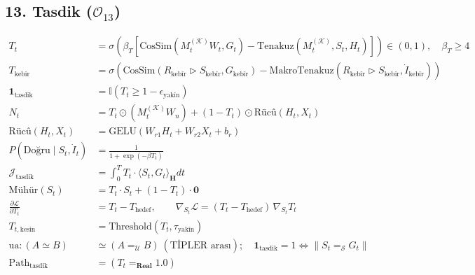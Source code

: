 \documentclass[11pt, a4paper]{article}
\begin{document}
\subsection{13. Tasdik ($\mathcal{O}_{13}$)}
\begin{align}
T_t &= \sigma\left( \beta_T \left[ \text{CosSim}(M_t^{(\mathcal{K})} W_t, G_t) - \text{Tenakuz}(M_t^{(\mathcal{K})}, S_t, H_t) \right] \right) \in (0,1), \quad \beta_T \ge 4 \\
T_{\text{kebîr}} &= \sigma\left( \text{CosSim}(R_{\text{kebîr}} \triangleright S_{\text{kebîr}}, G_{\text{kebîr}}) - \text{MakroTenakuz}(R_{\text{kebîr}} \triangleright S_{\text{kebîr}}, \dot{I}_{\text{kebîr}}) \right) \\
\mathbf{1}_{\text{tasdik}} &= \mathbb{I}(T_t \ge 1 - \epsilon_{\text{yakîn}}) \\
N_t &= T_t \odot (M_t^{(\mathcal{K})} W_n) + (1 - T_t) \odot \text{Rücû}(H_t, X_t) \\
\text{Rücû}(H_t, X_t) &= \text{GELU}(W_{r1} H_t + W_{r2} X_t + b_r) \\
P(\text{Doğru} \mid S_t, \dot{I}_t) &= \frac{1}{1 + \exp(-\beta T_t)} \\
\mathcal{J}_{\text{tasdik}} &= \int_0^T T_t \cdot \langle S_t, G_t \rangle_{\mathbf{H}} dt \\
\text{Mühür}(S_t) &= T_t \cdot S_t + (1 - T_t) \cdot \mathbf{0} \\
\frac{\partial \mathcal{L}}{\partial T_t} &= T_t - T_{\text{hedef}}, \qquad \nabla_{S_t} \mathcal{L} = (T_t - T_{\text{hedef}}) \, \nabla_{S_t} T_t \\
T_{t, \text{kesin}} &= \text{Threshold}(T_t, \tau_{\text{yakîn}}) \\
\text{ua} : (A \simeq B) &\simeq (A =_{\mathcal{U}} B) \ (\text{TİPLER arası}); \quad \mathbf{1}_{\text{tasdik}} = 1 \iff \big\| S_t =_{\mathcal{S}} G_t \big\| \\
\text{Path}_{\text{tasdik}} &= (T_t =_{\mathbf{Real}} 1.0)
\end{align}
\end{document}
